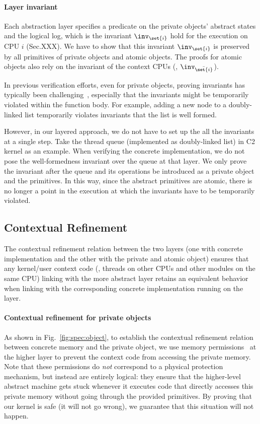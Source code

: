 \paragraph{Layer invariant}
Each abstraction layer specifies a predicate
on the private objects' abstract states
and the logical log,
which is the invariant $\inv_{\set{i}}$ hold for the execution on CPU $i$
(\cf Sec.XXX).
We have to show that this invariant $\inv_{\set{i}}$ is preserved
by all primitives of private objects and atomic objects.
The proofs for atomic  objects also rely on the
invariant of the context CPUs (\ie, $\inv_{\bar{\set{i}}}$).

In previous verification efforts, even for private objects,
proving invariants has typically been challenging~\cite{klein2009sel4},
especially that the invariants might be temporarily violated within the function body.
For example, adding a new node to a doubly-linked list
temporarily violates invariants that the list is well formed.

However, in our layered approach,
we do not have to set up the all the invariants at a single step.
Take the thread queue (implemented as doubly-linked list) in C2 kernel as an example.
When verifying the concrete implementation, we do not pose the well-formedness invariant
over the queue at that layer.
We only prove the invariant after the queue and its operations be introduced as a private object and the primitives.
In this way,
since the abstract primitives are atomic,
there is no longer a point in the execution
at which the invariants have to be temporarily violated.

\subsection{Contextual Refinement}
The contextual refinement relation between
the two layers (one with concrete implementation and the other
with the private and atomic object) ensures that any kernel/user context code 
(\ie, threads on other CPUs and other modules on the same CPU)
linking with the more abstract layer retains an
equivalent behavior when linking with the corresponding
concrete implementation running on the layer.

\paragraph{Contextual refinement for private objects}
As shown in Fig.~\ref{fig:spec:object},
to establish the contextual refinement relation
between concrete memory and the private object,
we use memory permissions~\cite{leroy08} at the higher layer
to prevent the context code
from accessing the private memory.
Note that these permissions do \emph{not}
correspond to a physical protection mechanism,
but instead are entirely logical:
they ensure that the higher-level abstract machine
gets stuck whenever it executes
code that directly accesses this private memory without going through the provided
primitives. By proving that our kernel is safe (it will not go wrong),
we guarantee that this situation will not happen.


